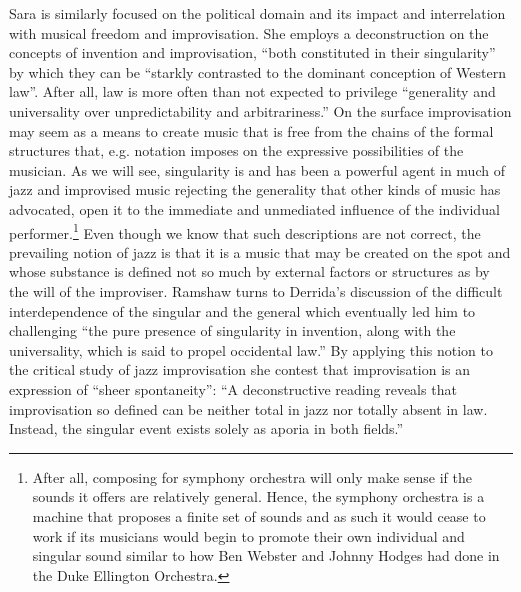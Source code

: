 \documentclass[a4paper]{article}
\begin{document}
Sara \citet{ramshaw2006} is similarly focused on the political domain and its impact and interrelation with musical freedom and improvisation. She employs a deconstruction on the concepts of invention and improvisation, ``both constituted in their singularity'' by which they can be ``starkly contrasted to the dominant conception of Western law''. After all, law is more often than not expected to privilege ``generality and universality over unpredictability and arbitrariness.'' On the surface improvisation may seem as a means to create music that is free from the chains of the formal structures that, e.g. notation imposes on the expressive possibilities of the musician. As we will see, singularity is and has been a powerful agent in much of jazz and improvised music rejecting the generality that other kinds of music has advocated, open it to the immediate and unmediated influence of the individual performer.\footnote{After all, composing for symphony orchestra will only make sense if the sounds it offers are relatively general. Hence, the symphony orchestra is a machine that proposes a finite set of sounds and as such it would cease to work if its musicians would begin to promote their own individual and singular sound similar to how Ben Webster and Johnny Hodges had done in the Duke Ellington Orchestra.} Even though we know that such descriptions are not correct, the prevailing notion of jazz is that it is a music that may be created on the spot and whose substance is defined not so much by external factors or structures as by the will of the improviser. Ramshaw turns to Derrida's discussion of the difficult interdependence of the singular and the general which eventually led him to challenging ``the pure presence of singularity in invention, along with the universality, which is said to propel occidental law.'' By applying this notion to the critical study of jazz improvisation she contest that improvisation is an expression of ``sheer spontaneity'': ``A deconstructive reading reveals that improvisation so defined can be neither total in jazz nor totally absent in law. Instead, the singular event exists solely as aporia in both fields.''
\end{document}
